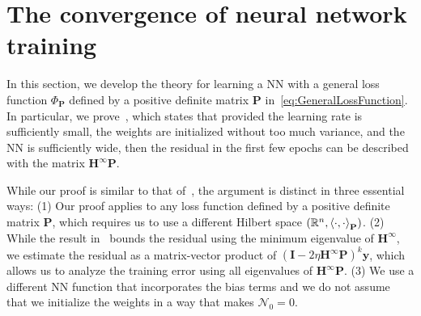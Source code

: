 
\section{The convergence of neural network training}\label{sec:genNTK}
In this section, we develop the theory for learning a NN with a general loss function $\Phi_{\mathbf{P}}$ defined by a positive definite matrix $\mathbf{P}$ in~\cref{eq:GeneralLossFunction}. In particular, we prove~, which states that provided the learning rate is sufficiently small, the weights are initialized without too much variance, and the NN is sufficiently wide, then the residual in the first few epochs can be described with the matrix $\mathbf{H}^\infty\mathbf{P}$.

While our proof is similar to that of~\citep{suyang}, the argument is distinct in three essential ways: (1) Our proof applies to any loss function defined by a positive definite matrix $\mathbf{P}$, which requires us to use a different Hilbert space $(\mathbb{R}^n, \left\langle \cdot, \cdot \right\rangle_\mathbf{P})$. (2) While the result in~\citep{suyang} bounds the residual using the minimum eigenvalue of $\mathbf{H}^\infty$, we estimate the residual as a matrix-vector product of $(\mathbf{I} - 2\eta \mathbf{H}^\infty \mathbf{P})^k \mathbf{y}$, which allows us to analyze the training error using all eigenvalues of $\mathbf{H}^\infty \mathbf{P}$. (3) We use a different NN function that incorporates the bias terms and we do not assume that we initialize the weights in a way that makes $\mathcal{N}_0 = 0$.

